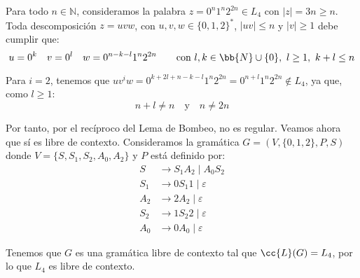 \begin{ejercicio}
\begin{enumerate}
        Para todo $n\in \mathbb{N}$, consideramos la palabra $z=0^n1^n2^{2n}\in L_4$ con $|z|=3n\geq n$. Toda descomposición $z=uvw$, con $u,v,w\in \{0,1,2\}^\ast$, $|uv|\leq n$ y $|v|\geq 1$ debe cumplir que:
        \begin{equation*}
            u=0^k \quad v=0^l \quad w=0^{n-k-l}1^n2^{2n} \qquad \text{con } l,k\in \bb{N}\cup \{0\},~l\geq 1,~k+l\leq n
        \end{equation*}

        Para $i=2$, tenemos que $uv^iw=0^{k+2l+n-k-l}1^n2^{2n}=0^{n+l}1^n2^{2n}\notin L_4$, ya que, como $l\geq 1$:
        \begin{equation*}
            n+l\neq n \quad \text{y} \quad n\neq 2n
        \end{equation*}

        Por tanto, por el recíproco del Lema de Bombeo, no es regular. Veamos ahora que sí es libre de contexto. Consideramos la gramática $G=(V,\{0,1,2\},P,S)$ donde $V=\{S,S_1,S_2,A_0,A_2\}$ y $P$ está definido por:
        \begin{align*}
            S &\rightarrow S_1 A_2 \mid A_0 S_2 \\
            S_1 &\rightarrow 0S_1 1 \mid \varepsilon \\
            A_2 &\rightarrow 2 A_2 \mid \varepsilon \\
            S_2 &\rightarrow 1S_2 2 \mid \varepsilon \\
            A_0 &\rightarrow 0 A_0 \mid \varepsilon
        \end{align*}

        Tenemos que $G$ es una gramática libre de contexto tal que $\cc{L}(G)=L_4$, por lo que $L_4$ es libre de contexto.
    \end{enumerate}
\end{ejercicio}

